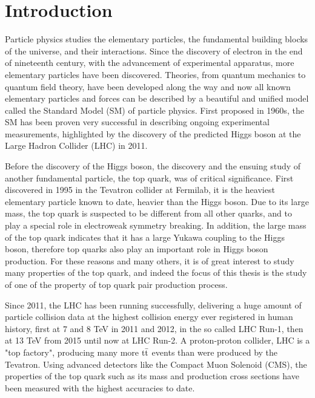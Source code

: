 \chapter*{Introduction}

Particle physics studies the elementary particles, the fundamental building blocks of the universe, and their interactions. Since the discovery of electron in the end of nineteenth century, with the advancement of experimental apparatus, more elementary particles have been discovered. Theories, from quantum mechanics to quantum field theory, have been developed along the way and now all known elementary particles and forces can be described by a beautiful and unified model called the Standard Model (SM) of particle physics. First proposed in 1960s, the SM has been proven very successful in describing ongoing experimental measurements, highlighted by the discovery of the predicted Higgs boson at the Large Hadron Collider (LHC) in 2011. 

Before the discovery of the Higgs boson, the discovery and the ensuing study of another fundamental particle, the top quark, was of critical significance. First discovered in 1995 in the Tevatron collider at Fermilab, it is the heaviest elementary particle known to date, heavier than the Higgs boson. Due to its large mass, the top quark is suspected to be different from all other quarks, and to play a special role in electroweak symmetry breaking. In addition, the large mass of the top quark indicates that it has a large Yukawa coupling to the Higgs boson, therefore top quarks also play an important role in Higgs boson production. For these reasons and many others, it is of great interest to study many properties of the top quark, and indeed the focus of this thesis is the study of one of the property of top quark pair production process. 

Since 2011, the LHC has been running successfully, delivering a huge amount of particle collision data at the highest collision energy ever registered in human history, first at 7 and 8 TeV in 2011 and 2012, in the so called LHC Run-1, then at 13 TeV from 2015 until now at LHC Run-2. A proton-proton collider, LHC is a "top factory", producing many more $\mathrm{t}\bar{\mathrm{t}}$ events than were produced by the Tevatron. Using advanced detectors like the Compact Muon Solenoid (CMS), the properties of the top quark such as its mass and production cross sections have been measured with the highest accuracies to date. 

